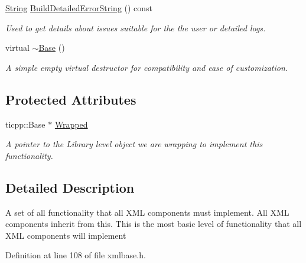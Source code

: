 \begin{DoxyCompactItemize}
\hyperlink{namespacephys_aa03900411993de7fbfec4789bc1d392e}{String} \hyperlink{classphys_1_1xml_1_1Base_a08794e2e0e61e5f7e58a665025466891}{BuildDetailedErrorString} () const 
\begin{DoxyCompactList}\small\item\em Used to get details about issues suitable for the the user or detailed logs. \item\end{DoxyCompactList}\item 
\hypertarget{classphys_1_1xml_1_1Base_a5748d180a12bbef51a7b61dc3e814364}{
virtual \hyperlink{classphys_1_1xml_1_1Base_a5748d180a12bbef51a7b61dc3e814364}{$\sim$Base} ()}
\label{df/d10/classphys_1_1xml_1_1Base_a5748d180a12bbef51a7b61dc3e814364}

\begin{DoxyCompactList}\small\item\em A simple empty virtual destructor for compatibility and ease of customization. \item\end{DoxyCompactList}\end{DoxyCompactItemize}
\subsection*{Protected Attributes}
\begin{DoxyCompactItemize}
\item 
ticpp::Base $\ast$ \hyperlink{classphys_1_1xml_1_1Base_a95edc995971b4ed433945a1a8843127e}{Wrapped}
\begin{DoxyCompactList}\small\item\em A pointer to the Library level object we are wrapping to implement this functionality. \item\end{DoxyCompactList}\end{DoxyCompactItemize}


\subsection{Detailed Description}
A set of all functionality that all XML components must implement. All XML components inherit from this. This is the most basic level of functionality that all XML components will implement 

Definition at line 108 of file xmlbase.h.



